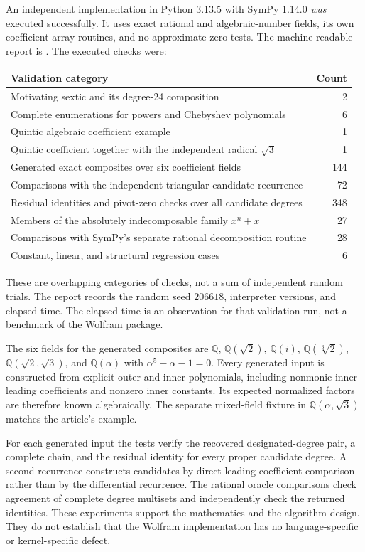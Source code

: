 \documentclass[11pt,a4paper]{article}
\theoremstyle{definition}
\newcommand{\Q}{\mathbb Q}
\newcommand{\code}[1]{\texttt{\detokenize{#1}}}
\begin{document}
An independent implementation in Python 3.13.5 with SymPy 1.14.0 \emph{was} executed successfully. It uses exact rational and algebraic-number fields, its own coefficient-array routines, and no approximate zero tests. The machine-readable report is \code{validation/validation_results.json}. The executed checks were:
\begin{center}
\begin{tabularx}{\textwidth}{@{}Xr@{}}
\toprule
Validation category & Count \\
\midrule
Motivating sextic and its degree-24 composition & 2 \\
Complete enumerations for powers and Chebyshev polynomials & 6 \\
Quintic algebraic coefficient example & 1 \\
Quintic coefficient together with the independent radical $\sqrt3$ & 1 \\
Generated exact composites over six coefficient fields & 144 \\
Comparisons with the independent triangular candidate recurrence & 72 \\
Residual identities and pivot-zero checks over all candidate degrees & 348 \\
Members of the absolutely indecomposable family $x^n+x$ & 27 \\
Comparisons with SymPy's separate rational decomposition routine & 28 \\
Constant, linear, and structural regression cases & 6 \\
\bottomrule
\end{tabularx}
\end{center}
These are overlapping categories of checks, not a sum of independent random trials. The report records the random seed $206618$, interpreter versions, and elapsed time. The elapsed time is an observation for that validation run, not a benchmark of the Wolfram package.

The six fields for the generated composites are $\Q$, $\Q(\sqrt2)$, $\Q(i)$, $\Q(\sqrt[3]2)$, $\Q(\sqrt2,\sqrt3)$, and $\Q(\alpha)$ with $\alpha^5-\alpha-1=0$. Every generated input is constructed from explicit outer and inner polynomials, including nonmonic inner leading coefficients and nonzero inner constants. Its expected normalized factors are therefore known algebraically. The separate mixed-field fixture in $\Q(\alpha,\sqrt3)$ matches the article's \code{Root} example.

For each generated input the tests verify the recovered designated-degree pair, a complete chain, and the residual identity for every proper candidate degree. A second recurrence constructs candidates by direct leading-coefficient comparison rather than by the differential recurrence. The rational oracle comparisons check agreement of complete degree multisets and independently check the returned identities. These experiments support the mathematics and the algorithm design. They do not establish that the Wolfram implementation has no language-specific or kernel-specific defect.
\end{document}
